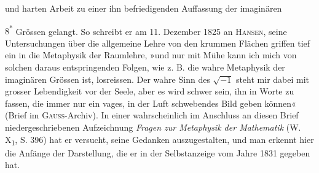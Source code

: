 und harten Arbeit zu einer ihn befriedigenden Auffassung der imaginären
\par\nobreak\hfill{\small 8\textsuperscript{*}}
\clearpage{}\setcounter{footnote}{0}
\noindent Grössen gelangt. So schreibt er am 11. Dezember 1825 an \textsc{Hansen}, seine
Untersuchungen über die allgemeine Lehre von den krummen Flächen griffen
tief ein in die Metaphysik der Raumlehre, »und nur mit Mühe kann ich mich
von solchen daraus entspringenden Folgen, wie z. B. die wahre Metaphysik
der imaginären Grössen ist, losreissen. Der wahre Sinn des \(\surd{-1}\) steht mir
dabei mit grosser Lebendigkeit vor der Seele, aber es wird schwer sein, ihn
in Worte zu fassen, die immer nur ein vages, in der Luft schwebendes Bild
geben können« (Brief im \textsc{Gauss}-Archiv). In einer wahrscheinlich im Anschluss
an diesen Brief niedergeschriebenen Aufzeichnung \textit{Fragen zur Metaphysik der
Mathematik} (W. X\textsubscript{1}, S. 396) hat er versucht, seine Gedanken auszugestalten,
und man erkennt hier die Anfänge der Darstellung, die er in der Selbstanzeige
vom Jahre 1831 gegeben hat.
\clearpage\endgroup

